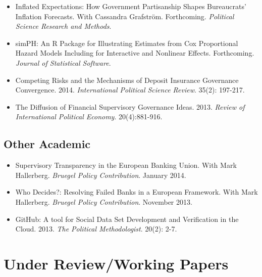 \documentclass[a4paper]{article}
\begin{document}
{{\begin{itemize}

    \item Inflated Expectations: How Government Partisanship Shapes Bureaucrats' Inflation Forecasts. With Cassandra Grafstr\"{o}m. Forthcoming. {\emph{Political Science Research and Methods}}.

    \item simPH: An R Package for Illustrating Estimates from Cox Proportional Hazard Models Including for Interactive and Nonlinear Effects. Forthcoming. {\emph{Journal of Statistical Software}}.

    \item Competing Risks and the Mechanisms of Deposit Insurance Governance Convergence. 2014. {\emph{International Political Science Review}}. 35(2): 197-217.

    \item The Diffusion of Financial Supervisory Governance Ideas. 2013. {\emph{Review of International Political Economy}}. 20(4):881-916.

\end{itemize}

\subsection*{Other Academic}

\begin{itemize}

    \item Supervisory Transparency in the European Banking Union. With Mark Hallerberg. {\emph{Bruegel Policy Contribution}}. January 2014.

    \item Who Decides?: Resolving Failed Banks in a European Framework. With Mark Hallerberg. {\emph{Bruegel Policy Contribution}}. November 2013.

    \item GitHub: A tool for Social Data Set Development and Verification in the Cloud. 2013. {\emph{The Political Methodologist}}.   20(2): 2-7.

\end{itemize}


\section*{Under Review/Working Papers}

\begin{itemize}


\end{itemize}}}
\end{document}
